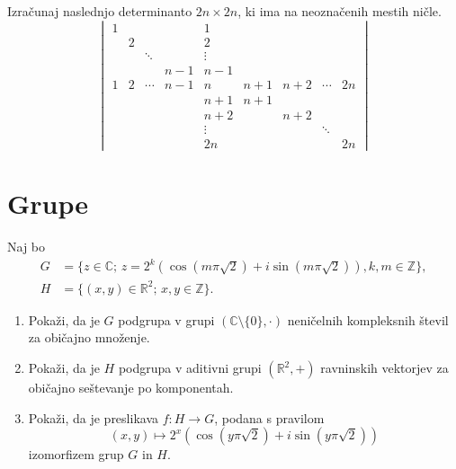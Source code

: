 \documentclass[a4paper,12pt]{article}
\begin{document}
Izračunaj naslednjo determinanto \(2n \times 2n\), ki ima na neoznačenih mestih ničle.
\[
\begin{vmatrix}
1 &   &        &     & 1      &     &     &        &    \\
  & 2 &        &     & 2      &     &     &        &    \\
  &   & \ddots &     & \vdots &     &     &        &    \\
  &   &        & n-1 & n-1    &     &     &        &    \\
1 & 2 & \cdots & n-1 & n      & n+1 & n+2 & \cdots & 2n \\
  &   &        &     & n+1    & n+1 &     &        &    \\
  &   &        &     & n+2    &     & n+2 &        &    \\
  &   &        &     & \vdots &     &     & \ddots &    \\
  &   &        &     & 2n     &     &     &        & 2n
\end{vmatrix}
\]

\section*{Grupe}

Naj bo
\begin{align*}
    G &= \{ z \in \mathbb{C}; \, z=2^k(\cos(m\pi\sqrt{2})+i\sin(m\pi\sqrt{2})), k,m \in \mathbb{Z} \}, \\
    H &= \{ (x,y) \in \mathbb{R}^2; \, x,y \in \mathbb{Z} \}.
\end{align*}
\begin{enumerate}
\item
Pokaži, da je \(G\) podgrupa v grupi \((\mathbb{C} \setminus \{0\}, \cdot)\)
neničelnih kompleksnih števil za običajno množenje.

\item
Pokaži, da je \(H\) podgrupa v aditivni grupi \((\mathbb{R}^2, +)\)
ravninskih vektorjev za običajno seštevanje po komponentah.

\item
Pokaži, da je preslikava \(f:H\to G\), podana s pravilom
\[
(x,y) \mapsto 2^x(\cos(y\pi\sqrt{2})+i\sin(y\pi\sqrt{2}))
\]
izomorfizem grup \(G\) in \(H\).
\end{enumerate}
\end{document}
